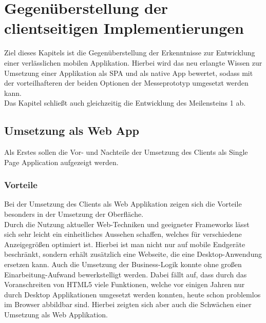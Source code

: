 \chapter{Gegenüberstellung der clientseitigen Implementierungen}
\label{cha:gegenueberstellung}
Ziel dieses Kapitels ist die Gegenüberstellung der Erkenntnisse zur Entwicklung einer verlässlichen mobilen Applikation. Hierbei wird das neu erlangte Wissen zur Umsetzung einer Applikation als \ac{SPA} und als native App bewertet, sodass mit der vorteilhafteren der beiden Optionen der Messeprototyp umgesetzt werden kann. \\
Das Kapitel schließt auch gleichzeitig die Entwicklung des Meilensteins 1 ab.

\section{Umsetzung als Web App}
\label{sec:gegenueberstellung-SPA}
Als Erstes sollen die Vor- und Nachteile der Umsetzung des Clients als Single Page Application aufgezeigt werden.

\subsection{Vorteile}
\label{sec:vorteile-SPA}
Bei der Umsetzung des Clients als Web Applikation zeigen sich die Vorteile besonders in der Umsetzung der Oberfläche. \\
Durch die Nutzung aktueller Web-Techniken und geeigneter Frameworks lässt sich sehr leicht ein einheitliches Aussehen schaffen, welches für verschiedene Anzeigegrößen optimiert ist. Hierbei ist man nicht nur auf mobile Endgeräte beschränkt, sondern erhält zusätzlich eine Webseite, die eine Desktop-Anwendung ersetzen kann. Auch die Umsetzung der Business-Logik konnte ohne großen Einarbeitung-Aufwand bewerkstelligt werden. Dabei fällt auf, dass durch das Voranschreiten von HTML5 viele Funktionen, welche vor einigen Jahren nur durch Desktop Applikationen umgesetzt werden konnten, heute schon problemlos im Browser abbildbar sind. Hierbei zeigten sich aber auch die Schwächen einer Umsetzung als Web Applikation. 

